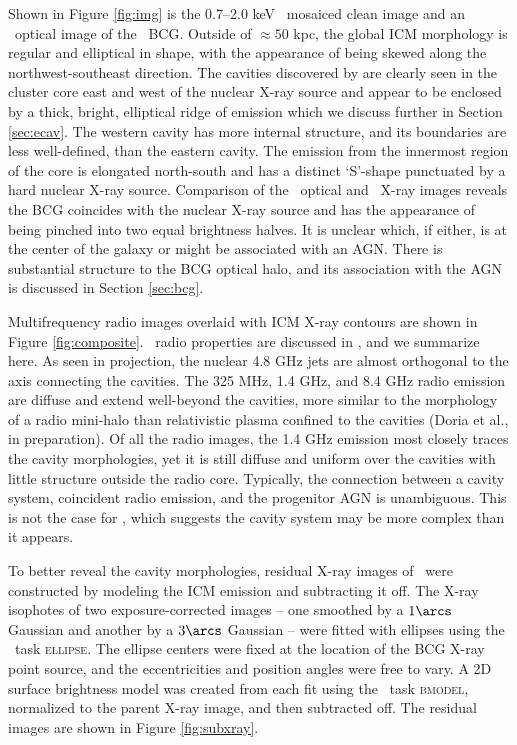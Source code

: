 \documentclass[iop]{emulateapj-rtx4}
\begin{document}
Shown in Figure \ref{fig:img} is the 0.7--2.0 keV \cxo\ mosaiced clean
image and an \hst\ optical image of the \rbs\ BCG. Outside of $\approx
50$ kpc, the global ICM morphology is regular and elliptical in shape,
with the appearance of being skewed along the northwest-southeast
direction. The cavities discovered by \citet{schindler01} are clearly
seen in the cluster core east and west of the nuclear X-ray source and
appear to be enclosed by a thick, bright, elliptical ridge of emission
which we discuss further in Section \ref{sec:ecav}. The western cavity
has more internal structure, and its boundaries are less well-defined,
than the eastern cavity. The emission from the innermost region of the
core is elongated north-south and has a distinct `S'-shape punctuated
by a hard nuclear X-ray source. Comparison of the \hst\ optical and
\cxo\ X-ray images reveals the BCG coincides with the nuclear X-ray
source and has the appearance of being pinched into two equal
brightness halves. It is unclear which, if either, is at the center of
the galaxy or might be associated with an AGN. There is substantial
structure to the BCG optical halo, and its association with the AGN is
discussed in Section \ref{sec:bcg}.

Multifrequency radio images overlaid with ICM X-ray contours are shown
in Figure \ref{fig:composite}. \rbs\ radio properties are discussed in
\citet{gitti06}, and we summarize here. As seen in projection, the
nuclear 4.8 GHz jets are almost orthogonal to the axis connecting the
cavities. The 325 MHz, 1.4 GHz, and 8.4 GHz radio emission are diffuse
and extend well-beyond the cavities, more similar to the morphology of
a radio mini-halo than relativistic plasma confined to the cavities
(Doria et al., in preparation). Of all the radio images, the 1.4 GHz
emission most closely traces the cavity morphologies, yet it is still
diffuse and uniform over the cavities with little structure outside
the radio core. Typically, the connection between a cavity system,
coincident radio emission, and the progenitor AGN is unambiguous. This
is not the case for \rbs, which suggests the cavity system may be more
complex than it appears.

To better reveal the cavity morphologies, residual X-ray images of
\rbs\ were constructed by modeling the ICM emission and subtracting it
off. The X-ray isophotes of two exposure-corrected images -- one
smoothed by a $1\arcs$ Gaussian and another by a $3\arcs$ Gaussian --
were fitted with ellipses using the \iraf\ task \textsc{ellipse}. The
ellipse centers were fixed at the location of the BCG X-ray point
source, and the eccentricities and position angles were free to
vary. A 2D surface brightness model was created from each fit using
the \iraf\ task \textsc{bmodel}, normalized to the parent X-ray image,
and then subtracted off. The residual images are shown in Figure
\ref{fig:subxray}.
\end{document}
